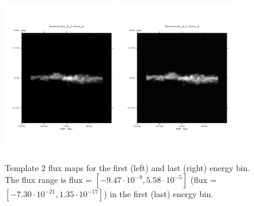 \documentclass{article}
\begin{document}
\begin{figure}
\centering
\includegraphics[trim = 50 100 70 100, clip = true, width=0.45\textwidth]{figs/Template_maps/Template2_Ebin01}
\includegraphics[trim = 50 100 70 100, clip = true, width=0.45\textwidth]{figs/Template_maps/Template2_Ebin71}
\caption{Template 2 flux maps for the first (left) and last (right) energy bin. The flux range is flux = $[-9.47 \cdot 10^{-9}, 5.58 \cdot 10^{-5}]$ (flux = $[-7.30 \cdot 10^{-21}, 1.35 \cdot 10^{-17}]$) in the first (last) energy bin.}
\end{figure}
\end{document}
